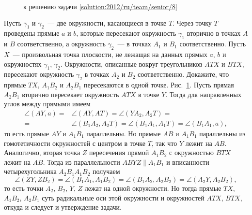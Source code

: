 \ifsolution
\begin{figure}\centering
    \caption{к решению задачи \ref{solution:2012/ru/team/senior/8}}
    \label{fig:solution:2012/ru/team/senior/8}
\end{figure}
\fi %

\problem{}
Пусть $\gamma_1$ и $\gamma_2$~--- две окружности, касающиеся в точке $T$.
Через точку $T$ проведены прямые $a$ и $b$, которые пересекают окружность $\gamma_1$ вторично в точках $A$ и $B$
соответственно, а окружность $\gamma_2$~--- в точках $A_1$ и $B_1$
соответственно.
Пусть $X$~--- произвольная точка плоскости, не лежащая на данных прямых $a$, $b$ и окружностях $\gamma_1$, $\gamma_2$.
Окружности, описанные вокруг треугольников $ATX$ и $BTX$, пересекают окружность $\gamma_2$ в точках $A_2$ и $B_2$ соответственно.
Докажите, что прямые $TX$, $A_1B_2$ и $A_2B_1$ пересекаются в одной точке.
\solution
\label{solution:2012/ru/team/senior/8}%
Рис.~\ref{fig:solution:2012/ru/team/senior/8}.
Пусть прямая $A_2 B_1$ вторично пересекает окружность $ATX$ в точке $Y$.
Тогда для направленных углов между прямыми имеем
\begin{align*}
    \angle (AY, a)
={}&
    \angle (AY, AT)
=
    \angle (Y A_2, A_2 T)
=\\={}&
    \angle (B_1 A_2, A_2 T)
=
    \angle (B_1 A_1, A_1 T)
=
    \angle (B_1 A_1, a)
,\end{align*}
то есть прямые $AY$ и $A_1 B_1$ параллельны.
Но прямые $AB$ и $A_1 B_1$ параллельны из гомотетичности окружностей с центром
в точке $T$, так что $Y$ лежит на $AB$.
Аналогично, вторая точка $Z$ пересечения прямой $A_1 B_2$ с окружностью $BTX$
лежит на $AB$.
Тогда из параллельности $ABYZ \parallel A_1 B_1$ и вписанности четырехугольника
$A_2 B_1 A_1B_2$ получаем
\[
    \angle (ZY, ZB_2)
=
    \angle (B_1A_1,A_1B_2)
=
    \angle (B_1A_2,A_2B_2)
=
    \angle (A_2Y,A_2B_2)
,\]
то есть точки $A_2$, $B_2$, $Y$, $Z$ лежат на одной окружности.
Но тогда прямые $TX$, $A_1B_2$, $A_2B_1$ суть радикальные оси этой окружности и
окружностей $ATX$, $BTX$, откуда и следует и утверждение задачи.
\endproblem
